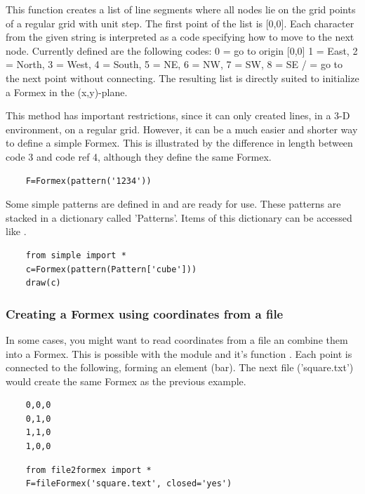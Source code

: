 \documentclass[a4paper]{manual}
\begin{document}
{%
    This function creates a list of line segments where all nodes lie on the
    grid points of a regular grid with unit step.
    The first point of the list is [0,0]. Each character from the given
    string is interpreted as a code specifying how to move to the next node.
    Currently defined are the following codes:
    0 = go to origin [0,0]
    1 = East, 2 = North, 3 = West, 4 = South, 5 = NE, 6 = NW, 7 = SW, 8 = SE
    / = go to the next point without connecting.
    The resulting list is directly suited to initialize a Formex in the
    (x,y)-plane.

This method has important restrictions, since it can only created lines, in a 3-D environment, on a regular grid. However, it can be a much easier and shorter way to define a simple Formex. This is illustrated by the difference in length between code 3 and code ref 4, although they define the same Formex.%
\begin{verbatim}
	F=Formex(pattern('1234'))
\end{verbatim}

Some simple patterns are defined in  and are ready for use. These patterns are stacked in a dictionary called 'Patterns'. Items of this dictionary can be accessed like .
\begin{verbatim}
	from simple import *
	c=Formex(pattern(Pattern['cube']))
	draw(c)
\end{verbatim}

\subsubsection{Creating a Formex using coordinates from a file}
In some cases, you might want to read coordinates from a file an combine them into a Formex. This is possible with the module  and it's function . Each point is connected to the following, forming an element (bar).
The next file ('square.txt') would create the same Formex as the previous example. %
\begin{verbatim}
	0,0,0
	0,1,0
	1,1,0
	1,0,0
\end{verbatim}
\begin{verbatim}
	from file2formex import *
	F=fileFormex('square.text', closed='yes')
\end{verbatim}

}
\end{document}
